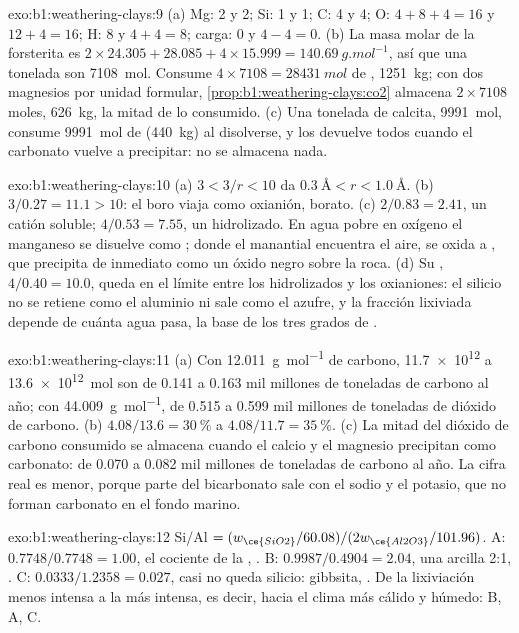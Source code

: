 \begin{solution}{exo:b1:weathering-clays:9}
(a) Mg: 2 y 2; Si: 1 y 1; C: 4 y 4; O: $4 + 8 + 4 = 16$ y $12 + 4 =
16$; H: 8 y $4 + 4 = 8$; carga: 0 y $4 - 4 = 0$. (b) La masa molar de la
forsterita es $2\times24.305 + 28.085 + 4\times15.999 =
\qty{140.69}{g.mol^{-1}}$, así que una tonelada son \qty{7108}{mol}. Consume
$4\times7108 = \qty{28431}{mol}$ de , \qty{1251}{kg}; con dos
magnesios por unidad formular, \cref{prop:b1:weathering-clays:co2} almacena
$2\times7108$ moles, \qty{626}{kg}, la mitad de lo consumido. (c) Una tonelada de
calcita, \qty{9991}{mol}, consume \qty{9991}{mol} de  (\qty{440}{kg})
al disolverse, y los devuelve todos cuando el carbonato vuelve a precipitar:
no se almacena nada.
\end{solution}

\begin{solution}{exo:b1:weathering-clays:10}
(a) $3 < 3/r < 10$ da $\qty{0.3}{\angstrom} < r < \qty{1.0}{\angstrom}$.
(b) $3/0.27 = 11.1 > 10$: el boro viaja como oxianión, borato. (c) $2/0.83 =
2.41$, un catión soluble; $4/0.53 = 7.55$, un hidrolizado. En agua pobre en
oxígeno el manganeso se disuelve como ; donde el manantial encuentra el aire,
se oxida a , que precipita de inmediato como un óxido negro sobre
la roca. (d) Su , $4/0.40 = 10.0$, queda en el límite entre los hidrolizados y los oxianiones: el silicio no se retiene
como el aluminio ni sale como el azufre, y la fracción lixiviada depende de cuánta agua pasa, la base de los tres grados de
.
\end{solution}

\begin{solution}{exo:b1:weathering-clays:11}
(a) Con \qty{12.011}{g.mol^{-1}} de carbono, \num{11.7e12} a \qty{13.6e12}{mol} son de 0.141 a 0.163 mil millones de toneladas de carbono al año; con
\qty{44.009}{g.mol^{-1}}, de 0.515 a 0.599 mil millones de toneladas de dióxido de carbono. (b) $4.08/13.6 = \qty{30}{\percent}$ a $4.08/11.7 = \qty{35}{\percent}$.
(c) La mitad del dióxido de carbono consumido se almacena cuando el calcio y el magnesio precipitan como carbonato: de 0.070 a 0.082 mil millones de
toneladas de carbono al año. La cifra real es menor, porque parte del bicarbonato sale con el sodio y el potasio, que no forman carbonato en el fondo marino.
\end{solution}

\begin{solution}{exo:b1:weathering-clays:12}
Si/Al $= (w_{\ce{SiO2}}/60.08)/(2w_{\ce{Al2O3}}/101.96)$. A: $0.7748/0.7748 =
1.00$, el cociente de la , . B: $0.9987/0.4904 = 2.04$, una
arcilla 2:1, . C: $0.0333/1.2358 = 0.027$, casi no queda silicio: gibbsita, . De la lixiviación menos intensa a la más
intensa, es decir, hacia el clima más cálido y húmedo: B, A, C.
\end{solution}

